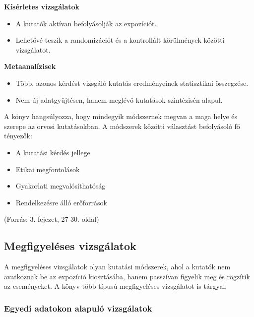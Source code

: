 \documentclass[a4paper,12pt]{article}
\begin{document}
    \textbf{Kísérletes vizsgálatok}
    \begin{itemize}
        \item A kutatók aktívan befolyásolják az expozíciót.
        \item Lehetővé teszik a randomizációt és a kontrollált körülmények közötti vizsgálatot.
    \end{itemize}

    \textbf{Metaanalízisek}
    \begin{itemize}
        \item Több, azonos kérdést vizsgáló kutatás eredményeinek statisztikai összegzése.
        \item Nem új adatgyűjtésen, hanem meglévő kutatások szintézisén alapul.
    \end{itemize}

    A könyv hangsúlyozza, hogy mindegyik módszernek megvan a maga helye és szerepe az orvosi kutatásokban. A módszerek közötti választást befolyásoló fő tényezők:

    \begin{itemize}
        \item A kutatási kérdés jellege
        \item Etikai megfontolások
        \item Gyakorlati megvalósíthatóság
        \item Rendelkezésre álló erőforrások
    \end{itemize}

    (Forrás: 3. fejezet, 27-30. oldal)

    \subsection{Megfigyeléses vizsgálatok}

    A megfigyeléses vizsgálatok olyan kutatási módszerek, ahol a kutatók nem avatkoznak be az expozíció kiosztásába, hanem passzívan figyelik meg és rögzítik az eseményeket. A könyv több típusú megfigyeléses vizsgálatot is tárgyal:

    \subsubsection{Egyedi adatokon alapuló vizsgálatok}
\end{document}
